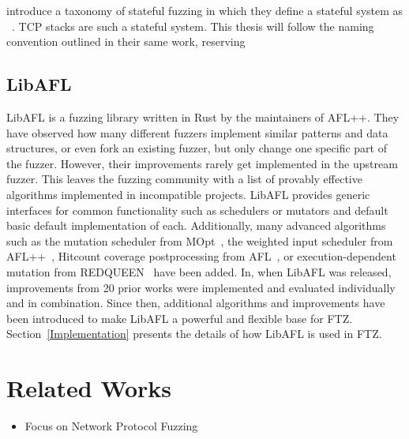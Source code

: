 \documentclass{article}
\newcommand{\proj}{FTZ\xspace}
\let\savedCite=\cite
\renewcommand{\cite}{\unskip~\savedCite}
\begin{document}
\begin{multicols}{2}
  \citeauthor{StatefulReview} introduce a taxonomy of stateful fuzzing in which they define a stateful system as \cite{StatefulReview}. TCP stacks are such a stateful system. This thesis will follow the naming convention outlined in their same work, reserving \cite{StatefulReview}

  \subsection{LibAFL}

  LibAFL is a fuzzing library written in Rust by the maintainers of AFL++. They have observed how many different fuzzers implement similar patterns and data structures, or even fork an existing fuzzer, but only change one specific part of the fuzzer. However,  their improvements rarely get implemented in the upstream fuzzer. This leaves the fuzzing community with a list of provably effective algorithms implemented in incompatible projects. LibAFL provides generic interfaces for common functionality such as schedulers or mutators and default basic default implementation of each.
  Additionally, many advanced algorithms such as the mutation scheduler from MOpt\cite{MOpt}, the weighted input scheduler from AFL++\cite{AFLPlusPlus}, Hitcount coverage postprocessing from AFL\cite{AFL}, or execution-dependent mutation from REDQUEEN\cite{REDQUEEN} have been added. In, when LibAFL was released, improvements from 20 prior works were implemented and evaluated individually and in combination. Since then, additional algorithms and improvements have been introduced to make LibAFL a powerful and flexible base for \proj. Section~\ref{Implementation} presents the details of how LibAFL is used in \proj.\cite{LibAFL}


  \section{Related Works}
  \label{RelatedWorks}
  \begin{itemize}
    \item Focus on Network Protocol Fuzzing
  \end{itemize}


\end{multicols}
\end{document}
